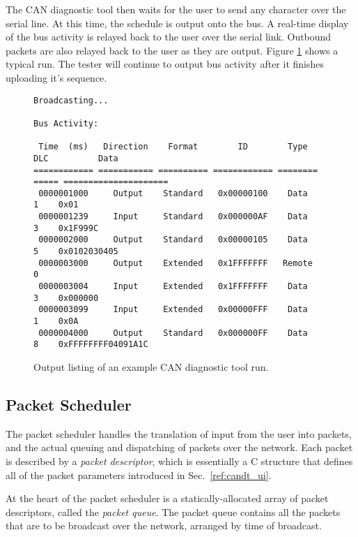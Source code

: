 The CAN diagnostic tool then waits for the user to send any character over the serial line. At this time, the schedule is output onto the bus. A real-time display of the bus activity is relayed back to the user over the serial link. Outbound packets are also relayed back to the user as they are output. Figure \ref{fig:candt_output} shows a typical run. The tester will continue to output bus activity after it finishes uploading it's sequence. 

\begin{figure}[H]
	\centering
	\makebox[\textwidth]{\hrulefill}
{\footnotesize	
	\begin{verbatim}
Broadcasting...

Bus Activity:

 Time  (ms)   Direction    Format        ID        Type    DLC          Data                  
============ =========== ========== ============ ======== ===== =====================
 0000001000     Output    Standard   0x00000100    Data     1    0x01 
 0000001239     Input     Standard   0x000000AF    Data     3    0x1F999C  
 0000002000     Output    Standard   0x00000105    Data     5    0x0102030405
 0000003000     Output    Extended   0x1FFFFFFF   Remote    0    
 0000003004     Input     Extended   0x1FFFFFFF    Data     3    0x000000
 0000003099     Input     Extended   0x00000FFF    Data     1    0x0A 
 0000004000     Output    Standard   0x000000FF    Data     8    0xFFFFFFFF04091A1C    
	\end{verbatim}
}	
	\makebox[\textwidth]{\hrulefill}
	\caption{Output listing of an example CAN diagnostic tool run.}
	\label{fig:candt_output}
\end{figure}
 
\subsection{Packet Scheduler}

The packet scheduler handles the translation of input from the user into packets, and the actual queuing and dispatching of packets over the network. Each packet is described by a \emph{packet descriptor}, which is essentially a C structure that defines all of the packet parameters introduced in Sec.\ \ref{ref:candt_ui}. 

At the heart of the packet scheduler is a statically-allocated array of packet descriptors, called the \emph{packet queue}. The packet queue contains all the packets that are to be broadcast over the network, arranged by time of broadcast.

